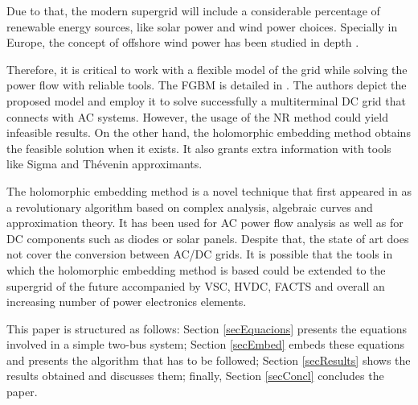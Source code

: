 \documentclass[conference]{IEEEtran}
\begin{document}
Due to that, the modern supergrid will include a considerable percentage of renewable energy sources, like solar power and wind power choices. Specially in Europe, the concept of offshore wind power has been studied in depth \cite{Gomis}. 

Therefore, it is critical to work with a flexible model of the grid while solving the power flow with reliable tools. The FGBM is detailed in \cite{alvarez}. The authors depict the proposed model and employ it to solve successfully a multiterminal DC grid that connects with AC systems. However, the usage of the NR method could yield infeasible results. On the other hand, the holomorphic embedding method obtains the feasible solution when it exists. It also grants extra information with tools like Sigma and Thévenin approximants.

The holomorphic embedding method is a novel technique that first appeared in \cite{Trias2012} as a revolutionary algorithm based on complex analysis, algebraic curves and approximation theory. It has been used for AC power flow analysis as well as for DC components such as diodes or solar panels. Despite that, the state of art does not cover the conversion between AC/DC grids. It is possible that the tools in which the holomorphic embedding method is based could be extended to the supergrid of the future accompanied by VSC, HVDC, FACTS and overall an increasing number of power electronics elements.

This paper is structured as follows: Section \ref{secEquacions} presents the equations involved in a simple two-bus system; Section \ref{secEmbed} embeds these equations and presents the algorithm that has to be followed; Section \ref{secResults} shows the results obtained and discusses them; finally, Section \ref{secConcl} concludes the paper.
\end{document}
